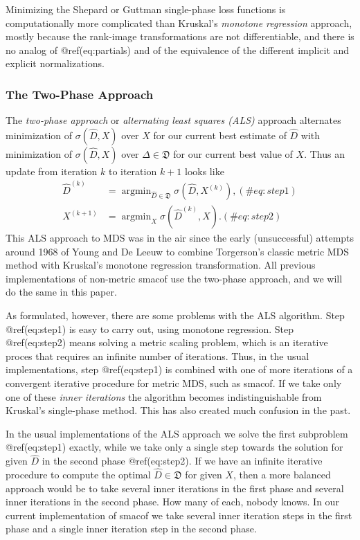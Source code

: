 \documentclass[
  12pt,
  letterpaper,
  DIV=11,
  numbers=noendperiod]{scrartcl}
\begin{document}
Minimizing the Shepard or Guttman single-phase loss functions is
computationally more complicated than Kruskal's \emph{monotone
regression} approach, mostly because the rank-image transformations are
not differentiable, and there is no analog of @ref(eq:partials) and of
the equivalence of the different implicit and explicit normalizations.

\subsubsection{The Two-Phase Approach}\label{the-two-phase-approach}

The \emph{two-phase approach} or \emph{alternating least squares (ALS)}
approach alternates minimization of \(\sigma(\hat D,X)\) over \(X\) for
our current best estimate of \(\hat D\) with minimization of
\(\sigma(\hat D,X)\) over \(\Delta\in\mathfrak{D}\) for our current best
value of \(X\). Thus an update from iteration \(k\) to iteration \(k+1\)
looks like \begin{subequations}
\begin{align}
\hat D^{(k)}&=\mathop{\text{argmin}}_{\hat D\in\mathfrak{D}}\sigma(\hat D,X^{(k)}),(\#eq:step1)\\
X^{(k+1)}&=\mathop{\text{argmin}}_X\sigma(\hat D^{(k)},X).(\#eq:step2)
\end{align} 
\end{subequations} This ALS approach to MDS was in the air since the
early (unsuccessful) attempts around 1968 of Young and De Leeuw to
combine Torgerson's classic metric MDS method with Kruskal's monotone
regression transformation. All previous implementations of non-metric
smacof use the two-phase approach, and we will do the same in this
paper.

As formulated, however, there are some problems with the ALS algorithm.
Step @ref(eq:step1) is easy to carry out, using monotone regression.
Step @ref(eq:step2) means solving a metric scaling problem, which is an
iterative proces that requires an infinite number of iterations. Thus,
in the usual implementations, step @ref(eq:step1) is combined with one
of more iterations of a convergent iterative procedure for metric MDS,
such as smacof. If we take only one of these \emph{inner iterations} the
algorithm becomes indistinguishable from Kruskal's single-phase method.
This has also created much confusion in the past.

In the usual implementations of the ALS approach we solve the first
subproblem @ref(eq:step1) exactly, while we take only a single step
towards the solution for given \(\hat D\) in the second phase
@ref(eq:step2). If we have an infinite iterative procedure to compute
the optimal \(\hat D\in\mathfrak{D}\) for given \(X\), then a more
balanced approach would be to take several inner iterations in the first
phase and several inner iterations in the second phase. How many of
each, nobody knows. In our current implementation of smacof we take
several inner iteration steps in the first phase and a single inner
iteration step in the second phase.
\end{document}
